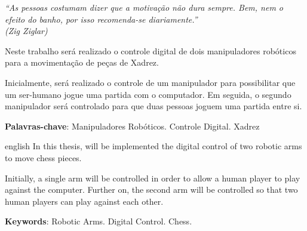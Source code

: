 \begin{epigrafe}
    \vspace*{\fill}
	\begin{flushright}
		\textit{``As pessoas costumam dizer que a motivação não dura sempre. Bem, nem o efeito do banho, por isso recomenda-se diariamente.''\\
		(Zig Ziglar)}
	\end{flushright}
\end{epigrafe}


\setlength{\absparsep}{18pt} %
\begin{resumo}
Neste trabalho será realizado o controle digital de dois manipuladores robóticos para a movimentação de peças de Xadrez. 

Inicialmente, será realizado o controle de um manipulador para possibilitar que um ser-humano jogue uma partida com o computador.
Em seguida, o segundo manipulador será controlado para que duas pessoas joguem uma partida entre si.

 \textbf{Palavras-chave}: Manipuladores Robóticos. Controle Digital. Xadrez
\end{resumo}

\begin{resumo}[Abstract]
 \begin{otherlanguage*}{english}
   In this thesis, will be implemented the digital control of two robotic arms to move chess pieces.

   Initially, a single arm will be controlled in order to allow a human player to play against the computer.
   Further on, the second arm will be controlled so that two human players can play against each other.

   \vspace{\onelineskip}
 
   \noindent 
   \textbf{Keywords}: Robotic Arms. Digital Control. Chess.
 \end{otherlanguage*}
\end{resumo}



\listoffigures*
\cleardoublepage

\listoftables*
\cleardoublepage

